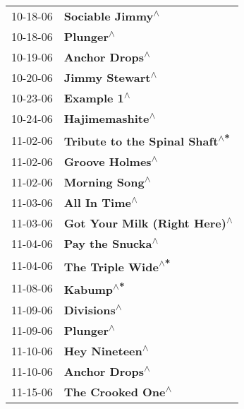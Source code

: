 \begin{supertabular}{p{0.25\columnwidth}p{0.75\columnwidth}}
 10-18-06 &                                  \textbf{Sociable Jimmy\textsuperscript{$\wedge$}} \\
 10-18-06 &                                         \textbf{Plunger\textsuperscript{$\wedge$}} \\
 10-19-06 &                                    \textbf{Anchor Drops\textsuperscript{$\wedge$}} \\
 10-20-06 &                                   \textbf{Jimmy Stewart\textsuperscript{$\wedge$}} \\
 10-23-06 &                                       \textbf{Example 1\textsuperscript{$\wedge$}} \\
 10-24-06 &                                   \textbf{Hajimemashite\textsuperscript{$\wedge$}} \\
 11-02-06 &                    \textbf{Tribute to the Spinal Shaft\textsuperscript{$\wedge$*}} \\
 11-02-06 &                                   \textbf{Groove Holmes\textsuperscript{$\wedge$}} \\
 11-02-06 &                                    \textbf{Morning Song\textsuperscript{$\wedge$}} \\
 11-03-06 &                                     \textbf{All In Time\textsuperscript{$\wedge$}} \\
 11-03-06 &                      \textbf{Got Your Milk (Right Here)\textsuperscript{$\wedge$}} \\
 11-04-06 &                                  \textbf{Pay the Snucka\textsuperscript{$\wedge$}} \\
 11-04-06 &                                \textbf{The Triple Wide\textsuperscript{$\wedge$*}} \\
 11-08-06 &                                         \textbf{Kabump\textsuperscript{$\wedge$*}} \\
 11-09-06 &                                       \textbf{Divisions\textsuperscript{$\wedge$}} \\
 11-09-06 &                                         \textbf{Plunger\textsuperscript{$\wedge$}} \\
 11-10-06 &                                    \textbf{Hey Nineteen\textsuperscript{$\wedge$}} \\
 11-10-06 &                                    \textbf{Anchor Drops\textsuperscript{$\wedge$}} \\
 11-15-06 &                                 \textbf{The Crooked One\textsuperscript{$\wedge$}} \\

\end{supertabular}
